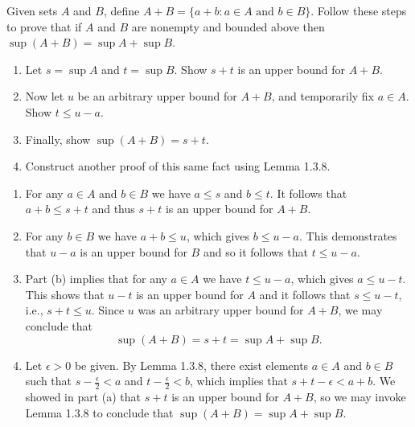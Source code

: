 \documentclass{lew98_solutions}
\begin{document}
\begin{exercise}
\label{ex:1.3.6}
    Given sets \( A \) and \( B \), define \( A + B = \{ a + b : a \in A \text{ and } b \in B \} \). Follow these steps to prove that if \( A \) and \( B \) are nonempty and bounded above then \( \sup (A + B) = \sup A + \sup B \).
    \begin{enumerate}
        \item Let \( s = \sup A \) and \( t = \sup B \). Show \( s + t \) is an upper bound for \( A + B \).

        \item Now let \( u \) be an arbitrary upper bound for \( A + B \), and temporarily fix \( a \in A \). Show \( t \leq u - a \).

        \item Finally, show \( \sup (A + B) = s + t \).

        \item Construct another proof of this same fact using Lemma 1.3.8.
    \end{enumerate}
\end{exercise}

\begin{solution}
    \begin{enumerate}
        \item For any \( a \in A \) and \( b \in B \) we have \( a \leq s \) and \( b \leq t \). It follows that \( a + b \leq s + t \) and thus \( s + t \) is an upper bound for \( A + B \).

        \item For any \( b \in B \) we have \( a + b \leq u \), which gives \( b \leq u - a \). This demonstrates that \( u - a \) is an upper bound for \( B \) and so it follows that \( t \leq u - a \).

        \item Part (b) implies that for any \( a \in A \) we have \( t \leq u - a \), which gives \( a \leq u - t \). This shows that \( u - t \) is an upper bound for \( A \) and it follows that \( s \leq u - t \), i.e., \( s + t \leq u \). Since \( u \) was an arbitrary upper bound for \( A + B \), we may conclude that
        \[
            \sup(A + B) = s + t = \sup A + \sup B.
        \]

        \item Let \( \epsilon > 0 \) be given. By Lemma 1.3.8, there exist elements \( a \in A \) and \( b \in B \) such that \( s - \tfrac{\epsilon}{2} < a \) and \( t - \tfrac{\epsilon}{2} < b \), which implies that \( s + t - \epsilon < a + b \). We showed in part (a) that \( s + t \) is an upper bound for \( A + B \), so we may invoke Lemma 1.3.8 to conclude that \( \sup(A + B) = \sup A + \sup B \).
    \end{enumerate}
\end{solution}
\end{document}
